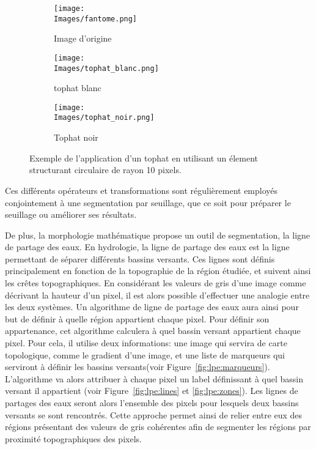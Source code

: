 \documentclass[\main/main.tex]{subfiles}
\begin{document}
\begin{figure}[h]
    \centering
    \begin{subfigure}[b]{0.30\textwidth}
       \caption{
       Image d'origine
            }
       \centering \texttt{[image: \\Images/fantome.png]}
    \end{subfigure}
    \begin{subfigure}[b]{0.30\textwidth}
       \caption{
       \label{fig:tophat:blanc}
            tophat blanc
            }
       \centering \texttt{[image: \\Images/tophat\_blanc.png]}
    \end{subfigure}
    \begin{subfigure}[b]{0.30\textwidth}
       \caption{
           \label{fig:tophat:noir}
            Tophat noir
            }
       \centering \texttt{[image: \\Images/tophat\_noir.png]}
    \end{subfigure}
    \caption{
        Exemple de l'application d'un tophat en utilisant un élement structurant circulaire de rayon 10 pixels.
    }
    
\end{figure}
%
Ces différents opérateurs et transformations sont régulièrement employés conjointement à une segmentation par seuillage,
que ce soit pour préparer le seuillage ou améliorer ses résultats\cite{ilhan_2019,siri_2020,liu_2019}.

%
De plus, la morphologie mathématique propose un outil de segmentation, la ligne de partage des eaux\cite{meyer_1994}.
%
En hydrologie, la ligne de partage des eaux est la ligne permettant de séparer différents bassins versants.
%
Ces lignes sont définis principalement en fonction de la topographie de la région étudiée, et suivent ainsi les crêtes topographiques.
%
En considérant les valeurs de gris d'une image comme décrivant la hauteur d'un pixel,
il est alors possible d'effectuer une analogie entre les deux systèmes.
%
Un algorithme de ligne de partage des eaux aura ainsi pour but de définir à quelle région appartient chaque pixel.
%
Pour définir son appartenance,
cet algorithme calculera à quel bassin versant appartient chaque pixel.
%
Pour cela, il utilise deux informations: une image qui servira de carte topologique, comme le gradient d'une image, et une liste de marqueurs qui serviront à définir les bassins versants(voir Figure~\ref{fig:lpe:marqueurs}).
%
L'algorithme va alors attribuer à chaque pixel un label définissant à quel bassin versant il appartient (voir Figure~\ref{fig:lpe:lines} et \ref{fig:lpe:zones}).
%
Les lignes de partages des eaux seront alors l'ensemble des pixels pour lesquels deux bassins versants se sont rencontrés.
%
Cette approche permet ainsi de relier entre eux des régions présentant des valeurs de gris cohérentes afin de segmenter les régions par proximité topographiques des pixels\cite{liang_2019,eschweiler_2019}.
%
\end{document}

